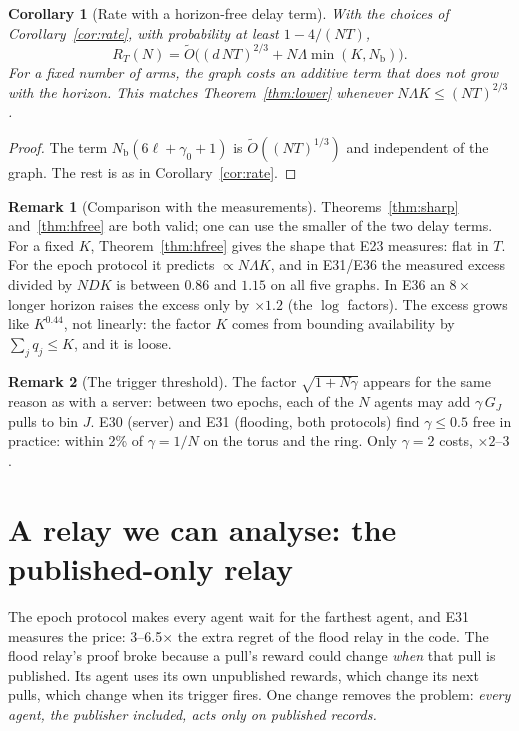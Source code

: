 \documentclass[11pt]{article}
\newtheorem{corollary}[theorem]{Corollary}
\theoremstyle{definition}
\newtheorem{remark}{Remark}
\newcommand{\Nb}{N_{\mathrm b}}
\begin{document}
\begin{corollary}[Rate with a horizon-free delay term]\label{cor:hfree}
With the choices of Corollary~\ref{cor:rate}, with probability at least $1-4/(NT)$,
\[
R_T(N)=\tilde O\Big((d\,NT)^{2/3}+N\Lambda\min(K,\Nb)\Big).
\]
For a fixed number of arms, the graph costs an additive term that \emph{does not grow with the horizon}. This matches
Theorem~\ref{thm:lower} whenever $N\Lambda K\le(NT)^{2/3}$.
\end{corollary}
\begin{proof}
The term $\Nb(6\ell+\gamma_0+1)$ is $\tilde O((NT)^{1/3})$ and independent of the graph. The rest is as in
Corollary~\ref{cor:rate}.
\end{proof}

\begin{remark}[Comparison with the measurements]
Theorems~\ref{thm:sharp} and~\ref{thm:hfree} are both valid; one can use the smaller of the two delay terms. For a
fixed $K$, Theorem~\ref{thm:hfree} gives the shape that E23 measures: flat in $T$. For the epoch protocol it predicts
$\propto N\Lambda K$, and in E31/E36 the measured excess divided by $NDK$ is between $0.86$ and $1.15$ on all five
graphs. In E36 an $8\times$ longer horizon raises the excess only by $\times1.2$ (the $\log$ factors). The excess grows
like $K^{0.44}$, not linearly: the factor $K$ comes from bounding availability by $\sum_jq_j\le K$, and it is loose.
\end{remark}

\begin{remark}[The trigger threshold]
The factor $\sqrt{1+N\gamma}$ appears for the same reason as with a server: between two epochs, each of the $N$
agents may add $\gamma\,G_J$ pulls to bin $J$. E30 (server) and E31 (flooding, both protocols) find $\gamma\le0.5$
free in practice: within 2\% of $\gamma=1/N$ on the torus and the ring. Only $\gamma=2$ costs, $\times2$--$3$.
\end{remark}

\section{A relay we can analyse: the published-only relay}\label{sec:pubrelay}

The epoch protocol makes every agent wait for the farthest agent, and E31 measures the price: 3--6.5$\times$ the extra
regret of the flood relay in the code. The flood relay's proof broke because a pull's reward could change \emph{when}
that pull is published. Its agent uses its own unpublished rewards, which change its next pulls, which change when its
trigger fires. One change removes the problem: \emph{every agent, the publisher included, acts only on published
records.}
\end{document}
